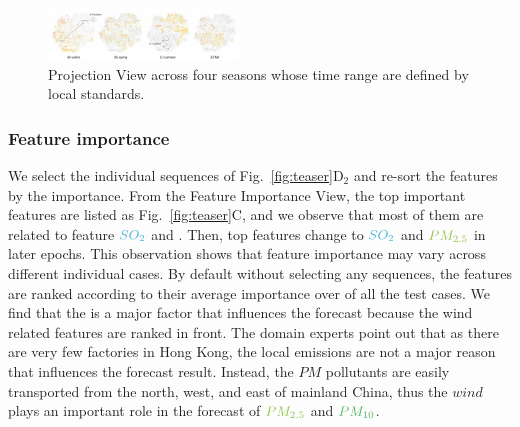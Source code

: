 
\begin{figure}[t]
	\centering
	\includegraphics[width=0.45\textwidth]{pictures/Evaluation/seasonal_behavior.pdf}
	\vspace{-3mm}
	\caption{Projection View across four seasons whose time range are defined by local standards.}
	\label{fig:seasonal_feature}
	\vspace{-4mm}
\end{figure}

\subsubsection{Feature importance}
We select the individual sequences of Fig.~\ref{fig:teaser}D$_2$ and re-sort the features by the importance. 
From the Feature Importance View, the top important features are listed as Fig.~\ref{fig:teaser}C, and we observe that most of them are related to feature $\color{SO2Color}{SO_{2}}$ and \textit{\color{WINDColor}{Wind Speed}}.
Then, top features change to $\color{SO2Color}{SO_2}$ and $\color{PM25Color}{PM_{2.5}}$ in later epochs. 
This observation shows that feature importance may vary across different individual cases. 
By default without selecting any sequences, the features are ranked according to their average importance over of all the test cases. 
We find that the \textit{\color{WINDColor}{Wind Speed}} is a major factor that influences the forecast because the wind related features are ranked in front.
The domain experts point out that as there are very few factories in Hong Kong, the local emissions are not a major reason that influences the forecast result. 
Instead, the $PM$ pollutants are easily transported from the north, west, and east of mainland China, thus the $wind$ plays an important role in the forecast of $\color{PM25Color}{PM_{2.5}}$ and $\color{PM10Color}{PM_{10}}$.

